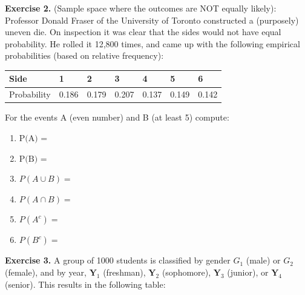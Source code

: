 \documentclass[
]{book}
\begin{document}
\textbf{Exercise 2.} (Sample space where the outcomes are NOT equally likely): Professor Donald Fraser of the University of Toronto constructed a (purposely) uneven die. On inspection it was clear that the sides would not have equal probability. He rolled it 12,800 times, and came up with the following empirical probabilities (based on relative frequency):

\begin{longtable}[]{@{}lllllll@{}}
\toprule\noalign{}
Side & 1 & 2 & 3 & 4 & 5 & 6 \\
\midrule\noalign{}
\endhead
\bottomrule\noalign{}
\endlastfoot
Probability & 0.186 & 0.179 & 0.207 & 0.137 & 0.149 & 0.142 \\
\end{longtable}

For the events A (even number) and B (at least 5) compute:

\begin{enumerate}
\def\labelenumi{\alph{enumi})}
\item
  \(\text{P(A) =}\)
\item
  \(\text{P(B) =}\)
\item
  \(P(A \cup B)=\)
\item
  \(P(A\cap B) =\)
\item
  \(P(A^c) =\)
\item
  \(P(B^c) =\)
\end{enumerate}

\textbf{Exercise 3.} A group of 1000 students is classified by gender \(G_1\) (male) or \(G_2\) (female), and by year, \(\textbf{Y}_1\) (freshman), \(\textbf{Y}_2\) (sophomore), \(\textbf{Y}_3\) (junior), or \(\textbf{Y}_4\) (senior). This results in the following table:
\end{document}
